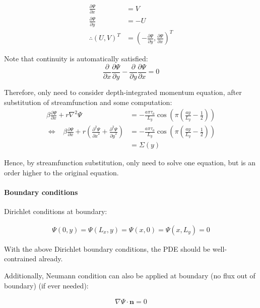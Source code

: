 \documentclass[11pt]{article}
\begin{document}
\begin{align*}
\frac{\partial \Psi}{\partial x} &= V \\
\frac{\partial \Psi}{\partial y} &= -U\\
\therefore \left( U,V \right)^T &= \left(-\frac{\partial \Psi}{\partial y}, \frac{\partial \Psi}{\partial x} \right)^T
\end{align*}

Note that continuity is automatically satisfied: \[
\frac{\partial}{\partial x} \frac{\partial \Psi}{\partial y} -  \frac{\partial}{\partial y} \frac{\partial \Psi}{\partial x} = 0
\]

Therefore, only need to consider depth-integrated momentum equation,
after substitution of streamfunction and some computation:
\begin{align*}
\beta \frac{\partial \Psi}{\partial x} + r \nabla^2 \Psi &= - \frac{ a \pi \tau_0}{L_y} \cos{\left( \pi \left( \frac{a y}{L_y} - \frac{1}{2} \right) \right)} \\
\iff \,\,\,\,\,\beta \frac{\partial \Psi}{\partial x} + r \left( \frac{\partial^2 \Psi}{{\partial x}^2} + \frac{\partial^2 \Psi}{{\partial y}^2} \right) &= - \frac{ a \pi \tau_0}{L_y} \cos{\left( \pi \left( \frac{a y}{L_y} - \frac{1}{2} \right) \right)}\\
&= \Sigma(y)
\end{align*}

Hence, by streamfunction substitution, only need to solve one equation,
but is an order higher to the original equation.

    \hypertarget{boundary-conditions}{%
\paragraph{Boundary conditions}\label{boundary-conditions}}

Dirichlet conditions at boundary:

\begin{align*}
\Psi(0,y)= \Psi(L_x,y) = \Psi(x,0) = \Psi(x,L_y) = 0
\end{align*}

With the above Dirichlet boundary conditions, the PDE should be
well-contrained already.

Additionally, Neumann condition can also be applied at boundary (no flux
out of boundary) (if ever needed):

\begin{align*}
\nabla \Psi \cdot \mathbf{n} = 0
\end{align*}
\end{document}
